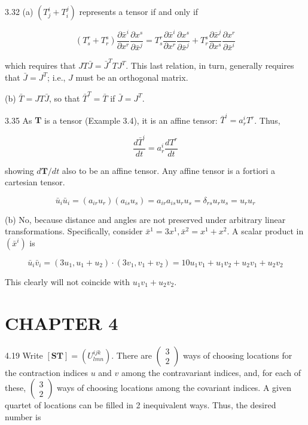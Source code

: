\documentclass[10pt]{article}
\begin{document}
3.32 (a) $\left(T_{j}^{i}+T_{i}^{j}\right)$ represents a tensor if and only if

$$
\left(T_{s}^{r}+T_{r}^{s}\right) \frac{\partial \bar{x}^{i}}{\partial x^{r}} \frac{\partial x^{s}}{\partial \bar{x}^{j}}=T_{s}^{r} \frac{\partial \bar{x}^{i}}{\partial x^{r}} \frac{\partial x^{s}}{\partial \bar{x}^{j}}+T_{r}^{s} \frac{\partial \bar{x}^{j}}{\partial x^{s}} \frac{\partial x^{r}}{\partial \bar{x}^{i}}
$$

which requires that $J T \bar{J}=\bar{J}^{T} T J^{T}$. This last relation, in turn, generally requires that $\bar{J}=J^{T}$; i.e., $J$ must be an orthogonal matrix.

(b) $\bar{T}=J T \bar{J}$, so that $\bar{T}^{T}=\bar{T}$ if $\bar{J}=J^{T}$.

3.35 As $\mathbf{T}$ is a tensor (Example 3.4), it is an affine tensor: $\bar{T}^{i}=a_{r}^{i} T^{r}$. Thus,

$$
\frac{d \bar{T}^{i}}{d t}=a_{r}^{i} \frac{d T^{r}}{d t}
$$

showing $d \mathbf{T} / d t$ also to be an affine tensor. Any affine tensor is a fortiori a cartesian tensor.


\begin{equation*}
\bar{u}_{i} \bar{u}_{i}=\left(a_{i r} u_{r}\right)\left(a_{i s} u_{s}\right)=a_{i r} a_{i s} u_{r} u_{s}=\delta_{r s} u_{r} u_{s}=u_{r} u_{r} \tag{a}
\end{equation*}


(b) No, because distance and angles are not preserved under arbitrary linear transformations. Specifically, consider $\bar{x}^{1}=3 x^{1}, \bar{x}^{2}=x^{1}+x^{2}$. A scalar product in $\left(\bar{x}^{i}\right)$ is

$$
\bar{u}_{i} \bar{v}_{i}=\left(3 u_{1}, u_{1}+u_{2}\right) \cdot\left(3 v_{1}, v_{1}+v_{2}\right)=10 u_{1} v_{1}+u_{1} v_{2}+u_{2} v_{1}+u_{2} v_{2}
$$

This clearly will not coincide with $u_{1} v_{1}+u_{2} v_{2}$.

\section*{CHAPTER 4}
4.19 Write $[\mathbf{S T}]=\left(U_{l m n}^{i j k}\right)$. There are $\left(\begin{array}{c}3 \\ 2\end{array}\right)$ ways of choosing locations for the contraction indices $u$ and $v$ among the contravariant indices, and, for each of these, $\left(\begin{array}{l}3 \\ 2\end{array}\right)$ ways of choosing locations among the covariant indices. A given quartet of locations can be filled in 2 inequivalent ways. Thus, the desired number is
\end{document}
